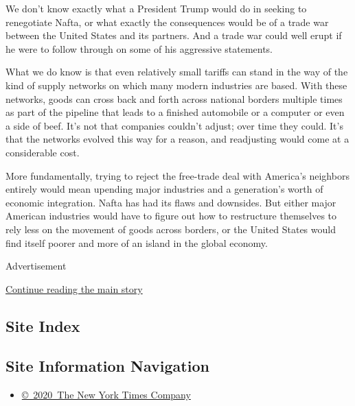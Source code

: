 We don't know exactly what a President Trump would do in seeking to
renegotiate Nafta, or what exactly the consequences would be of a trade
war between the United States and its partners. And a trade war could
well erupt if he were to follow through on some of his aggressive
statements.

What we do know is that even relatively small tariffs can stand in the
way of the kind of supply networks on which many modern industries are
based. With these networks, goods can cross back and forth across
national borders multiple times as part of the pipeline that leads to a
finished automobile or a computer or even a side of beef. It's not that
companies couldn't adjust; over time they could. It's that the networks
evolved this way for a reason, and readjusting would come at a
considerable cost.

More fundamentally, trying to reject the free-trade deal with America's
neighbors entirely would mean upending major industries and a
generation's worth of economic integration. Nafta has had its flaws and
downsides. But either major American industries would have to figure out
how to restructure themselves to rely less on the movement of goods
across borders, or the United States would find itself poorer and more
of an island in the global economy.

Advertisement

\protect\hyperlink{after-bottom}{Continue reading the main story}

\hypertarget{site-index}{%
\subsection{Site Index}\label{site-index}}

\hypertarget{site-information-navigation}{%
\subsection{Site Information
Navigation}\label{site-information-navigation}}

\begin{itemize}
\tightlist
\item
  \href{https://help.nytimes.com/hc/en-us/articles/115014792127-Copyright-notice}{©~2020~The
  New York Times Company}
\end{itemize}


